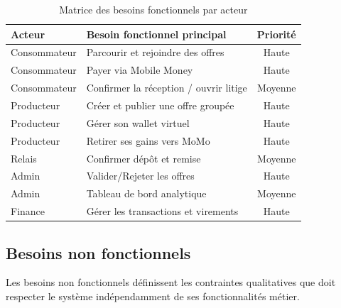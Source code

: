\documentclass[12pt, a4paper, oneside]{report}
\begin{document}
\begin{table}[H]
  \centering
  \caption{Matrice des besoins fonctionnels par acteur}
  \label{tab:besoins_fonctionnels}
  \begin{tabularx}{\textwidth}{|l|X|c|}
    \hline
    \textbf{Acteur} & \textbf{Besoin fonctionnel principal} & \textbf{Priorité} \\
    \hline
    Consommateur & Parcourir et rejoindre des offres & Haute \\
    \hline
    Consommateur & Payer via Mobile Money & Haute \\
    \hline
    Consommateur & Confirmer la réception / ouvrir litige & Moyenne \\
    \hline
    Producteur & Créer et publier une offre groupée & Haute \\
    \hline
    Producteur & Gérer son wallet virtuel & Haute \\
    \hline
    Producteur & Retirer ses gains vers MoMo & Haute \\
    \hline
    Relais & Confirmer dépôt et remise & Moyenne \\
    \hline
    Admin & Valider/Rejeter les offres & Haute \\
    \hline
    Admin & Tableau de bord analytique & Moyenne \\
    \hline
    Finance & Gérer les transactions et virements & Haute \\
    \hline
  \end{tabularx}
\end{table}

\subsection{Besoins non fonctionnels}

Les besoins non fonctionnels définissent les contraintes qualitatives que doit respecter
le système indépendamment de ses fonctionnalités métier.
\end{document}
